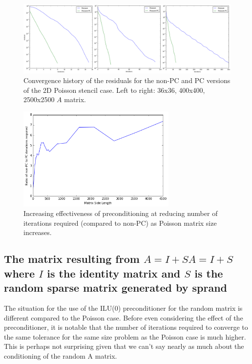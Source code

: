 \documentclass[letterpaper,10pt]{article}
\begin{document}
\begin{figure}[!htb]
\hskip -0.6in
\includegraphics[width=1.2\textwidth]{PoissonABC.PNG}
\caption{Convergence history of the residuals for the non-PC and PC versions of the 2D Poisson stencil case. Left to right: 36x36, 400x400, 2500x2500 $A$ matrix.}
\end{figure}

\begin{figure}[!htb]
\centering
\includegraphics[width=0.7\textwidth]{PoissonRat.PNG}
\caption{Increasing effectiveness of preconditioning at reducing number of iterations required (compared to non-PC) as Poisson matrix size increases.}
\end{figure}

\subsection*{The matrix resulting from $A=I+SA=I+S$ where $I$ is the identity matrix and $S$ is the random sparse matrix generated by sprand}
The situation for the use of the ILU(0) preconditioner for the random matrix is different compared to the Poisson case. Before even considering the effect of the preconditioner, it is notable that the number of iterations required to converge to the same tolerance for the same size problem as the Poisson case is much higher. This is perhaps not surprising given that we can't say nearly as much about the conditioning of the random A matrix.
\end{document}
